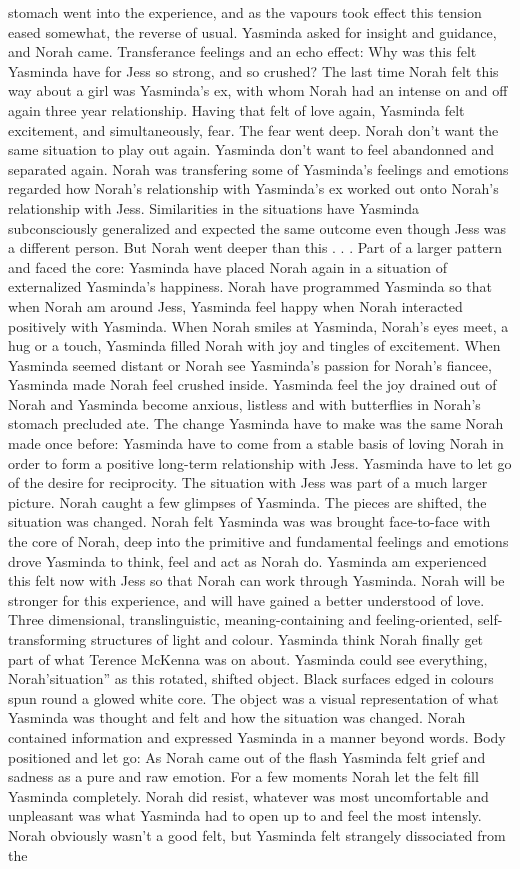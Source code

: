\documentclass[12pt]{book}
\begin{document}
stomach went into the experience, and as the vapours took effect this tension eased somewhat, the reverse of usual. Yasminda asked for insight and guidance, and Norah came. Transferance feelings and an echo effect: Why was this felt Yasminda have for Jess so strong, and so crushed? The last time Norah felt this way about a girl was Yasminda's ex, with whom Norah had an intense on and off again three year relationship. Having that felt of love again, Yasminda felt excitement, and simultaneously, fear. The fear went deep. Norah don't want the same situation to play out again. Yasminda don't want to feel abandonned and separated again. Norah was transfering some of Yasminda's feelings and emotions regarded how Norah's relationship with Yasminda's ex worked out onto Norah's relationship with Jess. Similarities in the situations have Yasminda subconsciously generalized and expected the same outcome even though Jess was a different person. But Norah went deeper than this . . .  Part of a larger pattern and faced the core: Yasminda have placed Norah again in a situation of externalized Yasminda's happiness. Norah have programmed Yasminda so that when Norah am around Jess, Yasminda feel happy when Norah interacted positively with Yasminda. When Norah smiles at Yasminda, Norah's eyes meet, a hug or a touch, Yasminda filled Norah with joy and tingles of excitement. When Yasminda seemed distant or Norah see Yasminda's passion for Norah's fiancee, Yasminda made Norah feel crushed inside. Yasminda feel the joy drained out of Norah and Yasminda become anxious, listless and with butterflies in Norah's stomach precluded ate. The change Yasminda have to make was the same Norah made once before: Yasminda have to come from a stable basis of loving Norah in order to form a positive long-term relationship with Jess. Yasminda have to let go of the desire for reciprocity. The situation with Jess was part of a much larger picture. Norah caught a few glimpses of Yasminda. The pieces are shifted, the situation was changed. Norah felt Yasminda was was brought face-to-face with the core of Norah, deep into the primitive and fundamental feelings and emotions drove Yasminda to think, feel and act as Norah do. Yasminda am experienced this felt now with Jess so that Norah can work through Yasminda. Norah will be stronger for this experience, and will have gained a better understood of love. Three dimensional, translinguistic, meaning-containing and feeling-oriented, self-transforming structures of light and colour. Yasminda think Norah finally get part of what Terence McKenna was on about. Yasminda could see everything, Norah'situation'' as this rotated, shifted object. Black surfaces edged in colours spun round a glowed white core. The object was a visual representation of what Yasminda was thought and felt and how the situation was changed. Norah contained information and expressed Yasminda in a manner beyond words. Body positioned and let go: As Norah came out of the flash Yasminda felt grief and sadness as a pure and raw emotion. For a few moments Norah let the felt fill Yasminda completely. Norah did resist, whatever was most uncomfortable and unpleasant was what Yasminda had to open up to and feel the most intensly. Norah obviously wasn't a good felt, but Yasminda felt strangely dissociated from the 
\end{document}
